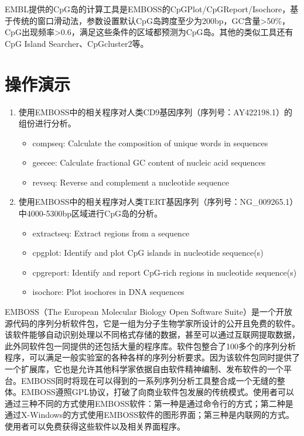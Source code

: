 \documentclass[11pt,a4paper,twoside]{book}
\begin{document}
EMBL提供的CpG岛的计算工具是EMBOSS的CpGPlot/CpGReport/Isochore，基于传统的窗口滑动法，参数设置默认CpG岛跨度至少为200bp，GC含量\textgreater 50\%，CpG出现频率\textgreater 0.6，满足这些条件的区域都预测为CpG岛。其他的类似工具还有CpG Island Searcher、CpGcluster2等。

\section{操作演示}
\begin{enumerate}
  \item 使用EMBOSS中的相关程序对人类CD9基因序列（序列号：AY422198.1）的组份进行分析。
    \begin{itemize}
      \item compseq: Calculate the composition of unique words in sequences
      \item geecee: Calculate fractional GC content of nucleic acid sequences
      \item revseq: Reverse and complement a nucleotide sequence
    \end{itemize}
  \item 使用EMBOSS中的相关程序对人类TERT基因序列（序列号：NG\_009265.1）中4000-5300bp区域进行CpG岛的分析。
    \begin{itemize}
      \item extractseq: Extract regions from a sequence
      \item cpgplot: Identify and plot CpG islands in nucleotide sequence(s)
      \item cpgreport: Identify and report CpG-rich regions in nucleotide sequence(s)
      \item isochore: Plot isochores in DNA sequences
    \end{itemize}
\end{enumerate}

EMBOSS（The European Molecular Biology Open Software Suite）是一个开放源代码的序列分析软件包，它是一组为分子生物学家所设计的公开且免费的软件。该软件能够自动识别处理以不同格式存储的数据，甚至可以通过互联网提取数据，此外同软件包一同提供的还包括大量的程序库。软件包整合了100多个的序列分析程序，可以满足一般实验室的各种各样的序列分析要求。因为该软件包同时提供了一个扩展库，它也是允许其他科学家依据自由软件精神编制、发布软件的一个平台。EMBOSS同时将现在可以得到的一系列序列分析工具整合成一个无缝的整体。EMBOSS遵照GPL协议，打破了向商业软件包发展的传统模式。使用者可以通过三种不同的方式使用EMBOSS软件：第一种是通过命令行的方式；第二种是通过X-Windows的方式使用EMBOSS软件的图形界面；第三种是内联网的方式。使用者可以免费获得这些软件以及相关界面程序。
\end{document}
